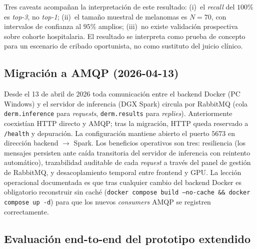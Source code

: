 Tres caveats acompañan la interpretación de este resultado: (i)~el
\emph{recall} del $100\%$ es \emph{top-3}, no \emph{top-1};
(ii)~el tamaño muestral de melanomas es $N = 70$, con intervalos
de confianza al $95\%$ amplios; (iii)~no existe validación
prospectiva sobre cohorte hospitalaria. El resultado se interpreta
como prueba de concepto para un escenario de cribado oportunista,
no como sustituto del juicio clínico.

\subsection{Migración a AMQP (2026-04-13)}
\label{sec:dermapixel-amqp-migracion}

Desde el 13 de abril de 2026 toda comunicación entre el backend
Docker (PC Windows) y el servidor de inferencia (DGX Spark)
circula por RabbitMQ (cola \texttt{derm.inference} para
\emph{requests}, \texttt{derm.results} para \emph{replies}).
Anteriormente coexistían HTTP directo y AMQP; tras la migración,
HTTP queda reservado a \texttt{/health} y depuración. La
configuración mantiene abierto el puerto $5673$ en dirección
backend $\to$ Spark. Los beneficios operativos son tres:
resiliencia (los mensajes persisten ante caída transitoria del
servidor de inferencia con reintento automático), trazabilidad
auditable de cada \emph{request} a través del panel de gestión
de RabbitMQ, y desacoplamiento temporal entre frontend y GPU. La
lección operacional documentada es que tras cualquier cambio
del backend Docker es obligatorio reconstruir sin caché
(\texttt{docker compose build --no-cache \&\& docker compose up
-d}) para que los nuevos \emph{consumers} AMQP se registren
correctamente.

\subsection{Evaluación end-to-end del prototipo extendido}
\label{sec:dermapixel-batch-test}


